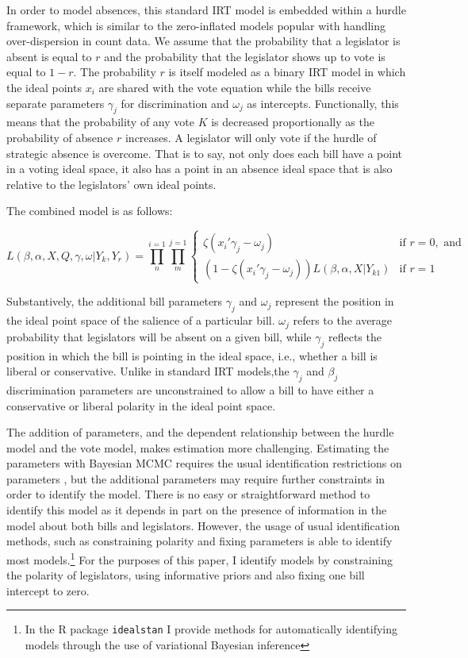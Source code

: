 	In order to model absences, this standard IRT model is embedded within a hurdle framework, which is similar to the zero-inflated models popular with handling over-dispersion in count data. We assume that the probability that a legislator is absent is equal to $r$ and the probability that the legislator shows up to vote is equal to $1-r$. The probability $r$ is itself modeled as a binary IRT model in which the ideal points $x_i$ are shared with the vote equation while the bills receive separate parameters $\gamma_j$ for discrimination and $\omega_j$ as intercepts. Functionally, this means that the probability of any vote $K$ is decreased proportionally as the probability of absence $r$ increases. A legislator will only vote if the hurdle of strategic absence is overcome. That is to say, not only does each bill have a point in a voting ideal space, it also has a point in an absence ideal space that is also relative to the legislators' own ideal points.
	
	The combined model is as follows:
	
		 \[
	L(\beta,\alpha,X,Q,\gamma,\omega|Y_{k},Y_{r}) = 
	\prod_{n}^{i=1} \prod_{m}^{j=1}
	\begin{cases}
	\zeta(x_{i}'\gamma_j - \omega_j ) & \text{if } r=0, \text{ and} \\
	(1-\zeta({x_{i}'\gamma_j - \omega_j}))L(\beta,\alpha,X|Y_{k1}) & \text{if } r=1
	\end{cases}
	\]
	
	Substantively, the additional bill parameters $\gamma_j$ and $\omega_j$ represent the position in the ideal point space of the salience of a particular bill. $\omega_j$ refers to the average probability that legislators will be absent on a given bill, while $\gamma_j$ reflects the position in which the bill is pointing in the ideal space, i.e., whether a bill is liberal or conservative. Unlike in standard IRT models,the $\gamma_j$ and $\beta_j$ discrimination parameters are unconstrained to allow a bill to have either a conservative or liberal polarity in the ideal point space. 
	
	The addition of parameters, and the dependent relationship between the hurdle model and the vote model, makes estimation more challenging. Estimating the parameters with Bayesian MCMC requires the usual identification restrictions on parameters \parencite{jackman2004,gelman2005}, but the additional parameters may require further constraints in order to identify the model. There is no easy or straightforward method to identify this model as it depends in part on the presence of information in the model about both bills and legislators. However, the usage of usual identification methods, such as constraining polarity and fixing parameters is able to identify most models.\footnote{In the R package \texttt{idealstan} I provide methods for automatically identifying models through the use of variational Bayesian inference} For the purposes of this paper, I identify models by constraining the polarity of legislators, using informative priors and also fixing one bill intercept to zero.
	

